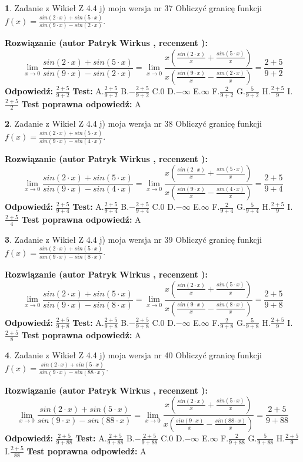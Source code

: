 \documentclass[12pt, a4paper]{article}
\theoremstyle{definition} %
\newtheorem{zad}{}
\newcommand{\zadStart}[1]{\begin{zad}#1\newline}
\newcommand{\zadStop}{\end{zad}}
\newcommand{\rozwStart}[2]{\noindent \textbf{Rozwiązanie (autor #1 , recenzent #2): }\newline}
\newcommand{\rozwStop}{\newline}
\newcommand{\odpStart}{\noindent \textbf{Odpowiedź:}\newline}
\newcommand{\odpStop}{\newline}
\newcommand{\testStart}{\noindent \textbf{Test:}\newline}
\newcommand{\testStop}{\newline}
\newcommand{\kluczStart}{\noindent \textbf{Test poprawna odpowiedź:}\newline}
\newcommand{\kluczStop}{\newline}
\begin{document}
\zadStart{Zadanie z Wikieł Z 4.4 j) moja wersja nr 37}
Obliczyć granicę funkcji $f(x)=\frac{sin(2\cdot x) +sin(5\cdot x)}{sin(9\cdot x) -sin(2\cdot x)}$.
\zadStop
\rozwStart{Patryk Wirkus}{}
$$\lim\limits_{x\to 0}\frac{sin(2\cdot x) +sin(5\cdot x)}{sin(9\cdot x) -sin(2\cdot x)}=\lim\limits_{x\to 0}\frac{x(\frac{sin(2\cdot x)}{x}+\frac{sin(5\cdot x)}{x})}{x(\frac{sin(9\cdot x)}{x}-\frac{sin(2\cdot x)}{x})}=\frac{2+5}{9+2}$$
\rozwStop
\odpStart
$\frac{2+5}{9+2}$
\odpStop
\testStart
A.$\frac{2+5}{9+2}$
B.$-\frac{2+5}{9+2}$
C.$0$
D.$-\infty$
E.$\infty$
F.$\frac{2}{9+2}$
G.$\frac{5}{9+2}$
H.$\frac{2+5}{9}$
I.$\frac{2+5}{2}$
\testStop
\kluczStart
A
\kluczStop



\zadStart{Zadanie z Wikieł Z 4.4 j) moja wersja nr 38}
Obliczyć granicę funkcji $f(x)=\frac{sin(2\cdot x) +sin(5\cdot x)}{sin(9\cdot x) -sin(4\cdot x)}$.
\zadStop
\rozwStart{Patryk Wirkus}{}
$$\lim\limits_{x\to 0}\frac{sin(2\cdot x) +sin(5\cdot x)}{sin(9\cdot x) -sin(4\cdot x)}=\lim\limits_{x\to 0}\frac{x(\frac{sin(2\cdot x)}{x}+\frac{sin(5\cdot x)}{x})}{x(\frac{sin(9\cdot x)}{x}-\frac{sin(4\cdot x)}{x})}=\frac{2+5}{9+4}$$
\rozwStop
\odpStart
$\frac{2+5}{9+4}$
\odpStop
\testStart
A.$\frac{2+5}{9+4}$
B.$-\frac{2+5}{9+4}$
C.$0$
D.$-\infty$
E.$\infty$
F.$\frac{2}{9+4}$
G.$\frac{5}{9+4}$
H.$\frac{2+5}{9}$
I.$\frac{2+5}{4}$
\testStop
\kluczStart
A
\kluczStop



\zadStart{Zadanie z Wikieł Z 4.4 j) moja wersja nr 39}
Obliczyć granicę funkcji $f(x)=\frac{sin(2\cdot x) +sin(5\cdot x)}{sin(9\cdot x) -sin(8\cdot x)}$.
\zadStop
\rozwStart{Patryk Wirkus}{}
$$\lim\limits_{x\to 0}\frac{sin(2\cdot x) +sin(5\cdot x)}{sin(9\cdot x) -sin(8\cdot x)}=\lim\limits_{x\to 0}\frac{x(\frac{sin(2\cdot x)}{x}+\frac{sin(5\cdot x)}{x})}{x(\frac{sin(9\cdot x)}{x}-\frac{sin(8\cdot x)}{x})}=\frac{2+5}{9+8}$$
\rozwStop
\odpStart
$\frac{2+5}{9+8}$
\odpStop
\testStart
A.$\frac{2+5}{9+8}$
B.$-\frac{2+5}{9+8}$
C.$0$
D.$-\infty$
E.$\infty$
F.$\frac{2}{9+8}$
G.$\frac{5}{9+8}$
H.$\frac{2+5}{9}$
I.$\frac{2+5}{8}$
\testStop
\kluczStart
A
\kluczStop



\zadStart{Zadanie z Wikieł Z 4.4 j) moja wersja nr 40}
Obliczyć granicę funkcji $f(x)=\frac{sin(2\cdot x) +sin(5\cdot x)}{sin(9\cdot x) -sin(88\cdot x)}$.
\zadStop
\rozwStart{Patryk Wirkus}{}
$$\lim\limits_{x\to 0}\frac{sin(2\cdot x) +sin(5\cdot x)}{sin(9\cdot x) -sin(88\cdot x)}=\lim\limits_{x\to 0}\frac{x(\frac{sin(2\cdot x)}{x}+\frac{sin(5\cdot x)}{x})}{x(\frac{sin(9\cdot x)}{x}-\frac{sin(88\cdot x)}{x})}=\frac{2+5}{9+88}$$
\rozwStop
\odpStart
$\frac{2+5}{9+88}$
\odpStop
\testStart
A.$\frac{2+5}{9+88}$
B.$-\frac{2+5}{9+88}$
C.$0$
D.$-\infty$
E.$\infty$
F.$\frac{2}{9+88}$
G.$\frac{5}{9+88}$
H.$\frac{2+5}{9}$
I.$\frac{2+5}{88}$
\testStop
\kluczStart
A
\kluczStop
\end{document}
